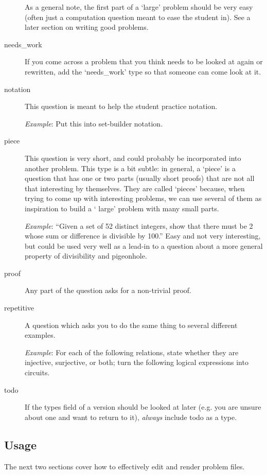 \begin{description}
      As a general note, the first part of a `large' problem should be 
      very easy (often just a computation question meant to ease the 
      student in). See a later section on writing good problems.
      \item[needs\_work] If you come across a problem that you think needs 
      to be looked at again or rewritten, add the `needs\_work' type so 
      that someone can come look at it. 
      \item[notation] This question is meant to help the student practice 
      notation.
      
        \textit{Example}: Put this into set-builder notation.
      \item[piece] This question is very short, and could probably be 
      incorporated into another problem. This type is a bit subtle: in 
      general, a `piece' is a question that has one or two parts (usually 
      short proofs) that are not all that interesting by themselves. They 
      are called `pieces' because, when trying to come up with interesting 
      problems, we can use several of them as inspiration to build a `
      large' problem with many small parts.
      
        \textit{Example}: ``Given a set of 52 distinct integers, show that 
        there must be 2 whose sum or difference is divisible by 100.'' 
        Easy and not very interesting, but could be used very well as a 
        lead-in to a question about a more general property of 
        divisibility and pigeonhole.
      \item[proof] Any part of the question asks for a non-trivial proof. 
      \item[repetitive] A question which asks you to do the same thing to 
      several different examples.
      
        \textit{Example}: For each of the following relations, state 
        whether they are injective, surjective, or both; turn the 
        following logical expressions into circuits.
      \item[todo] If the types field of a version should be looked at 
      later (e.g. you are unsure about one and want to return to it), 
      \textit{always} include todo as a type.
    \end{description}
    
  \subsection{Usage}
    The next two sections cover how to effectively edit and render problem 
    files.